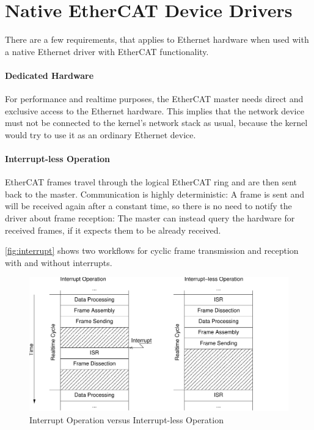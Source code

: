 \documentclass[a4paper,12pt,BCOR6mm,bibtotoc,idxtotoc]{scrbook}
\begin{document}

\section{Native EtherCAT Device Drivers}
\label{sec:native-drivers}

There are a few requirements, that applies to Ethernet hardware when used with
a native Ethernet driver with EtherCAT functionality.

\paragraph{Dedicated Hardware} For performance and realtime purposes, the
EtherCAT master needs direct and exclusive access to the Ethernet hardware.
This implies that the network device must not be connected to the kernel's
network stack as usual, because the kernel would try to use it as an ordinary
Ethernet device.

\paragraph{Interrupt-less Operation} EtherCAT frames travel
through the logical EtherCAT ring and are then sent back to the master.
Communication is highly deterministic: A frame is sent and will be received
again after a constant time, so there is no need to notify the driver about
frame reception: The master can instead query the hardware for received
frames, if it expects them to be already received.

\autoref{fig:interrupt} shows two workflows for cyclic frame transmission
and reception with and without interrupts.

\begin{figure}[htbp]
  \centering
  \includegraphics[width=.9\textwidth]{images/interrupt}
  \caption{Interrupt Operation versus Interrupt-less Operation}
  \label{fig:interrupt}
\end{figure}
\end{document}
